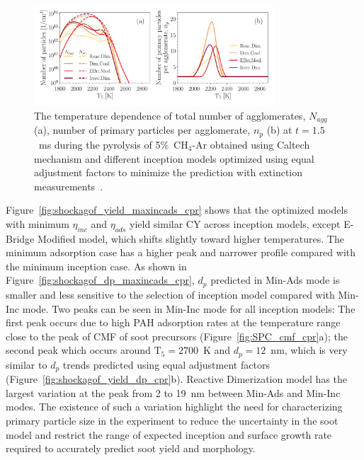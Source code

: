 \begin{figure}[H]
	\centering
	\includegraphics[width=0.8\textwidth]{Figures/Results/Shocktube/Agafonov2016_cpr/N_agg_n_p_5CH4.pdf}
	\caption{The temperature dependence of total number of agglomerates, $N_{agg}$ (a), number of primary particles per agglomerate, $n_p$ (b) at $t=1.5$~ms during the pyrolysis of 5\%~$\mathrm{CH_4}$-Ar obtained using Caltech mechanism and different inception models optimized using equal adjustment factors to minimize the prediction with extinction measurements~\citep{agafonov2016unified}.}
	\label{fig:shockagof_Nagg_np_cpr} 
\end{figure}



Figure~\ref{fig:shockagof_yield_maxincads_cpr} shows that the optimized models with minimum $\eta_{inc}$ and $\eta_{ads}$ yield similar CY across inception models, except E-Bridge Modified model, which shifts slightly toward higher temperatures. The minimum adsorption case has a higher peak and narrower profile compared with the minimum inception case. As shown in Figure~\ref{fig:shockagof_dp_maxincads_cpr}, $d_p$ predicted in Min-Ads mode is smaller and less sensitive to the selection of inception model compared with Min-Inc mode. Two peaks can be seen in Min-Inc mode for all inception models: The first peak occurs due to high PAH adsorption rates at the temperature range close to the peak of CMF of soot precursors (Figure~\ref{fig:SPC_cmf_cpr}a); the second peak which occurs around $\mathrm{T_5}=2700$~K and $d_p=12$~nm, which is very similar to $d_p$ trends predicted using equal adjustment factors (Figure~\ref{fig:shockagof_yield_dp_cpr}b). Reactive Dimerization model has the largest variation at the peak from 2 to 19~nm between Min-Ads and Min-Inc modes. The existence of such a variation highlight the need for characterizing primary particle size in the experiment to reduce the uncertainty in the soot model and restrict the range of expected inception and surface growth rate required to accurately predict soot yield and morphology.

